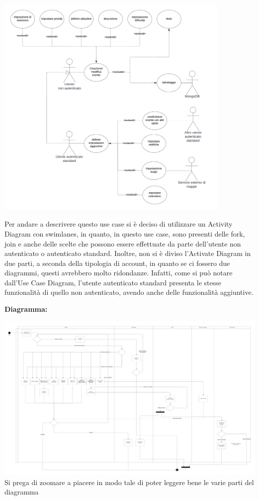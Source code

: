 \begin{listaPersonale}[UC]{}
    \begin{center}
        \includegraphics[width=0.85\textwidth, height = 0.5\textheight]{img/Diagrammi/UseCases/CreazioneModificaEvento.png}
    \end{center}
    Per andare a descrivere questo use case si è deciso di utilizzare un Activity Diagram con swimlanes, in quanto, in questo use case, sono presenti delle fork, join e anche delle scelte che possono essere effettuate da parte dell'utente non autenticato o autenticato standard. Inoltre, non si è diviso l'Activate Diagram in due parti, a seconda della tipologia di account, in quanto se ci fossero due diagrammi, questi avrebbero molto ridondanze. Infatti, come si può notare dall'Use Case Diagram, l'utente autenticato standard presenta le stesse funzionalità di quello non autenticato, avendo anche delle funzionalità aggiuntive.
    \newpage

    \textbf{Diagramma:}
    \begin{center}
        \includegraphics[width=1.1\textwidth, height = 0.4\textheight]{img/Diagrammi/DS/DS_CreazioneModificaEvento.png}
        Si prega di zoomare a piacere in modo tale di poter leggere bene le varie parti del diagramma
    \end{center}





\end{listaPersonale}
